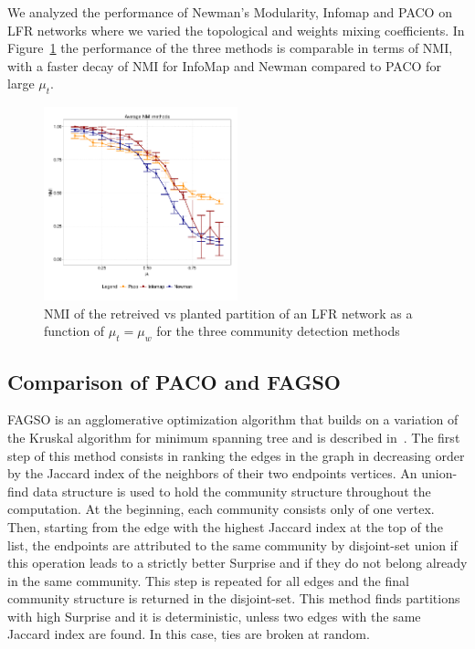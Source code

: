 We analyzed the performance of Newman's Modularity, Infomap and PACO on LFR networks where we varied the topological and weights mixing coefficients.
In Figure~\ref{fig:avgmutmuw} the performance of the three methods is comparable in terms of NMI, with a faster decay of NMI for InfoMap and Newman compared to PACO for large $\mu_t$.

\begin{figure}[htb!]
\centering
\includegraphics[width=0.5\textwidth]{images/avg_nmi_allmethods_lfr_errorbars.pdf}
\caption{NMI of the retreived vs planted partition of an LFR network as a function of $\mu_t=\mu_w$ for the three community detection methods}
\label{fig:avgmutmuw}
\end{figure}

\subsection{Comparison of PACO and FAGSO}

FAGSO is an agglomerative optimization algorithm that builds on a variation of the Kruskal algorithm for minimum spanning tree and is described in~\cite{nicolini2016}. The first step of this method consists in ranking the edges in the graph in decreasing order by the Jaccard index of the neighbors of their two endpoints vertices. An union-find data structure is used to hold the community structure throughout the computation. At the beginning, each community consists only of one vertex. Then, starting from the edge with the highest Jaccard index at the top of the list, the endpoints are attributed to the same community by disjoint-set union if this operation leads to a strictly better Surprise and if they do not belong already in the same community. This step is repeated for all edges and the final community structure is returned in the disjoint-set. This method finds partitions with high Surprise and it is deterministic, unless two edges with the same Jaccard index are found. In this case, ties are broken at random. 

